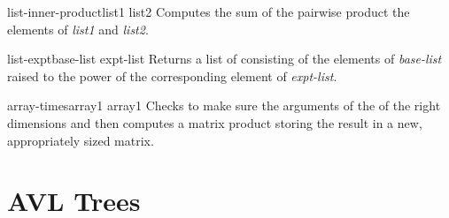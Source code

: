 \begin{methoddef}{list-inner-product}{list1 list2}
Computes the sum of the pairwise product the elements of {\em list1} and
{\em list2}. 
\end{methoddef}

\begin{methoddef}{list-expt}{base-list expt-list}
Returns a list of consisting of the elements of {\em base-list} raised
to the power of the corresponding element of {\em expt-list}.
\end{methoddef}

\begin{methoddef}{array-times}{array1 array1}
Checks to make sure the arguments of the of the right dimensions and
then computes a matrix product storing the result in a new,
appropriately sized matrix.
\end{methoddef}


\section{AVL Trees}
  
  

